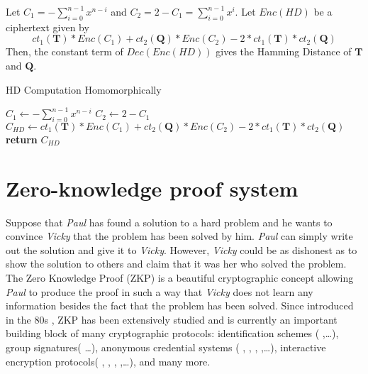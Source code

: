 \begin{theorem}
  Let $C_1 = - \sum_{i=0}^{n-1}x^{n-i}$ and
  $C_2 = 2 - C_1 = \sum_{i=0}^{n-1}x^i$. Let $Enc(HD)$ be a ciphertext given by
  \[
    ct_1(\mathbf{T})*Enc(C_1) + ct_2(\mathbf{Q})* Enc(C_2) -
    2*ct_1(\mathbf{T})*ct_2(\mathbf{Q})
  \]
  Then, the constant term of $Dec(Enc(HD))$ gives the Hamming Distance of
  $\mathbf{T}$ and $\mathbf{Q}$.
\end{theorem}

\begin{algorithm}
\caption{HD Computation Homomorphically}\label{alg:EvalDistance}
\begin{algorithmic}[1]
\State $C_1 \gets - \sum_{i=0}^{n-1}x^{n-i}$
\State $C_2 \gets 2 - C_1$
\State $C_{HD} \gets ct_1(\mathbf{T})*Enc(C_1) + ct_2(\mathbf{Q})*
Enc(C_2) - 2*ct_1(\mathbf{T})*ct_2(\mathbf{Q})$
\State \textbf{return} $C_{HD}$
\EndProcedure
\end{algorithmic}
\end{algorithm}

\section{Zero-knowledge proof system}
\label{sec:introzkp}
Suppose that \emph{Paul} has found a solution
to a hard problem and he wants to convince \emph{Vicky} that the problem has
been solved by him. \emph{Paul} can simply write out the solution and give it
to \emph{Vicky}. However, \emph{Vicky} could be as
dishonest as to show the solution to others and claim that
it was her who solved the problem. The Zero Knowledge Proof (ZKP) is a
beautiful cryptographic concept allowing \emph{Paul} to produce the proof
in such a way that \emph{Vicky} does not learn any information besides the 
fact that the problem has been solved. Since introduced
in the 80s \cite{goldwasser1989knowledge}, ZKP has been extensively
studied and is currently an important building block of many cryptographic
protocols: identification schemes ( \cite{fiat1986prove, feige1988zero, guillou1990paradoxical, schnorr1991efficient, stern1993new, kawachi2008concurrently},\dots), group signatures(
\cite{camenisch1997efficient, ateniese2000practical, boneh2004short, boneh2004group, groth2007fully}\dots),
anonymous credential systems ( \cite{camenisch2008efficient},
\cite{camenisch2001efficient}, \cite{belenkiy2009randomizable},
\cite{chase2013malleable},\dots), interactive encryption protocols(
\cite{galil1985symmetric}, \cite{goldreich2009foundations},
\cite{goldwasser2005proof}, \cite{katz2003efficient},\dots), and many more. 

